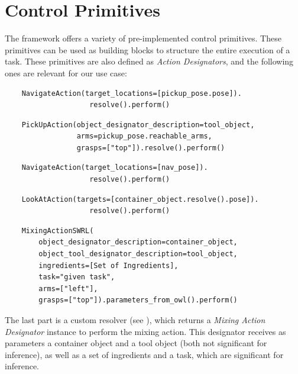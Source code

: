 \section{Control Primitives}
The framework  \cite{pycram} offers a variety of pre-implemented control primitives. These primitives can be used as building blocks to structure the entire execution of a task. These primitives are also defined as \textit{Action Designators}, and the following ones are relevant for our use case:

\begin{lstlisting}
	NavigateAction(target_locations=[pickup_pose.pose]).
					resolve().perform()
\end{lstlisting}
\begin{lstlisting}
	PickUpAction(object_designator_description=tool_object,
                 arms=pickup_pose.reachable_arms,
                 grasps=["top"]).resolve().perform()
\end{lstlisting}

\begin{lstlisting}
	NavigateAction(target_locations=[nav_pose]).
					resolve().perform()
\end{lstlisting}

\begin{lstlisting}
	LookAtAction(targets=[container_object.resolve().pose]).
					resolve().perform()
\end{lstlisting}

\begin{lstlisting}
	MixingActionSWRL(
		object_designator_description=container_object,
        object_tool_designator_description=tool_object,
		ingredients=[Set of Ingredients],
        task="given task",
        arms=["left"],
        grasps=["top"]).parameters_from_owl().perform()
\end{lstlisting}

The last part is a custom resolver (see ), which returns a \textit{Mixing Action Designator} instance to perform the mixing action.
This designator receives as parameters a container object and a tool object (both not significant for inference), as well as a set of ingredients and a task, 
which are significant for inference. 

